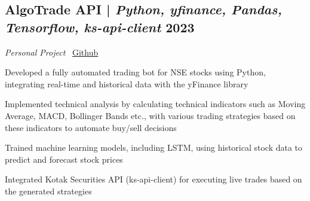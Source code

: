 

\subsection{AlgoTrade API \textnormal{ | \textit{Python, yfinance, Pandas, Tensorflow, ks-api-client} \hfill 2023}}
\textit{Personal Project} \hfill \faCodeFork\ \href{https://github.com/vinay-ram1999/AlgoTrade-API}{Github}
\begin{zitemize}
    \item Developed a fully automated trading bot for NSE stocks using Python, integrating real-time and historical data with the yFinance library
    \item Implemented technical analysis by calculating technical indicators such as Moving Average, MACD, Bollinger Bands etc., with various trading strategies based on these indicators to automate buy/sell decisions
    \item Trained machine learning models, including LSTM, using historical stock data to predict and forecast stock prices
    \item Integrated Kotak Securities API (ks-api-client) for executing live trades based on the generated strategies
\end{zitemize}


